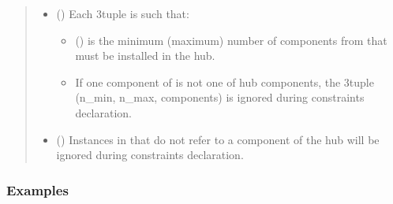 \documentclass[letterpaper,10pt,english]{sphinxmanual}
\begin{document}
\begin{fulllineitems}
\begin{fulllineitems}
\begin{quote}
\begin{description}
\begin{itemize}
\item {} 
\sphinxAtStartPar
{} (\sphinxstyleliteralemphasis{\sphinxupquote{ (}}\sphinxstyleliteralemphasis{\sphinxupquote{, }}\sphinxstyleliteralemphasis{\sphinxupquote{, }}\sphinxstyleliteralemphasis{\sphinxupquote{)}}\sphinxstyleliteralemphasis{\sphinxupquote{, }}) \textendash{} 
\sphinxAtStartPar
Each 3\sphinxhyphen{}tuple is such that:
\begin{itemize}
\item {} 
\sphinxAtStartPar
{} () is the minimum (maximum) number of components from  that must be installed in the hub.

\item {} \begin{description}
\sphinxAtStartPar
If one component of  is not one of hub components,
the 3\sphinxhyphen{}tuple (n\_min, n\_max, components) is ignored during constraints declaration.

\end{description}

\end{itemize}


\item {} 
\sphinxAtStartPar
{} (\sphinxstyleliteralemphasis{\sphinxupquote{, }}) \textendash{} Instances in  that do not refer to a component of the hub will be ignored during constraints declaration.

\end{itemize}

\end{description}\end{quote}
\subsubsection*{Examples}


\end{fulllineitems}
\end{fulllineitems}
\end{document}
